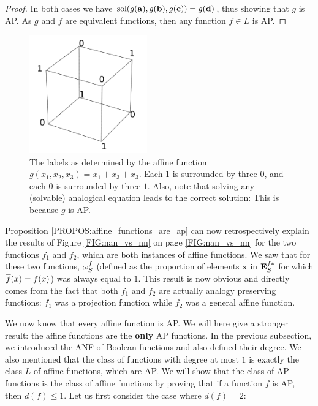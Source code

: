 \begin{proof}
  In both cases we have $\text{sol}(g(\mathbf{a}), g(\mathbf{b}), g(\mathbf{c})) =
  g(\mathbf{d})$, thus showing that $g$ is AP.
  As $g$ and $f$ are equivalent functions, then any function $f \in L$ is AP.
\end{proof}

\begin{figure}[!h]
\centering
  \includegraphics[width=2in]{figures/affine_functions_neighbors.pdf}
  \caption{The labels as determined by the affine function $g(x_1, x_2, x_3) =
  x_1 + x_3 + x_3$. Each $1$ is surrounded by three $0$, and each $0$
  is surrounded by three $1$. Also, note that solving any (solvable) analogical
  equation leads to the correct solution: This is because $g$ is AP.}
  \label{FIG:affine_functions_neighbors}
\end{figure}

Proposition \ref{PROPOS:affine_functions_are_ap} can now retrospectively
explain the results of Figure \ref{FIG:nan_vs_nn} on page \ref{FIG:nan_vs_nn}
for the two functions $f_1$ and $f_2$, which are both instances of affine
functions. We saw that for these two functions, $\omega_{S}^{f}$ (defined as the
proportion of elements $\mathbf{x}$ in $\mathbf{E}_{S}^{f*}$ for which $\overline{f}(x) = f(x)$) was
always equal to $1$. This result is now obvious and directly comes from the
fact that both $f_1$ and $f_2$ are actually analogy preserving functions: $f_1$
was a projection function while $f_2$ was a general affine function.

We now know that every affine function is AP. We will here give a stronger
result: the affine functions are the \textbf{only} AP functions.  In the
previous subsection, we introduced the ANF of Boolean functions and also
defined their degree. We also mentioned that the class of functions with degree
at most $1$ is exactly the class $L$ of affine functions, which are AP.  We
will show that the class of AP functions is the class of affine functions by
proving that if a function $f$ is AP, then $d(f)\leq 1$. Let us first consider
the case where $d(f) = 2$:

